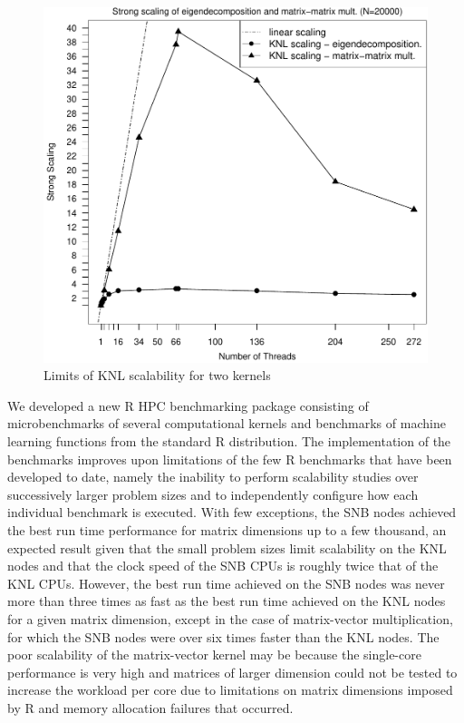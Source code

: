 \begin{figure}
\includegraphics[height=\columnwidth, width=\columnwidth]{eigen_matmat_20000_272_knl-ss.pdf}
\caption{Limits of KNL scalability for two kernels}
\label{fig:knlScalabilityLimits}
\end{figure}

We developed a new R HPC benchmarking package consisting of microbenchmarks of several
computational kernels and benchmarks of machine learning functions from the standard R
distribution. The implementation of the benchmarks improves upon limitations of the few R
benchmarks that have been developed to date, namely the inability to perform scalability
studies over successively larger problem sizes and to independently configure how each
individual benchmark is executed. With few exceptions, the SNB nodes achieved the best run
time performance for matrix dimensions up to a few thousand, an expected result given that
the small problem sizes limit scalability on the KNL nodes and that the clock speed of the
SNB CPUs is roughly twice that of the KNL CPUs. However, the best run time achieved on the
SNB nodes was never more than three times as fast as the best run time achieved on the KNL
nodes for a given matrix dimension, except in the case of matrix-vector multiplication,
for which the SNB nodes were over six times faster than the KNL nodes. The poor
scalability of the matrix-vector kernel may be because the single-core performance is very
high and matrices of larger dimension could not be tested to increase the workload per
core due to limitations on matrix dimensions imposed by R and memory allocation failures
that occurred.

